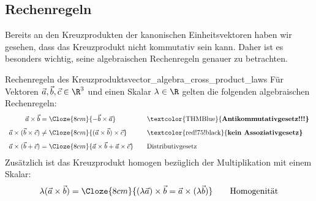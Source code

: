 \subsection{Rechenregeln}
\label{subsec:vector_algebra_cross_product_rules}

Bereits an den Kreuzprodukten der kanonischen Einheitsvektoren haben wir
gesehen, dass das Kreuzprodukt nicht kommutativ sein kann. Daher ist es
besonders wichtig, seine algebraischen Rechenregeln genauer zu betrachten.

\begin{TheoremBox}{Rechenregeln des Kreuzprodukts}{vector_algebra_cross_product_laws}
  Für Vektoren $\vec a,\vec b,\vec c\in\R^3$ und einen Skalar
  $\lambda\in\R$ gelten die folgenden algebraischen Rechenregeln:
  \[
    \begin{array}{r@{\;}c@{\;}l@{\qquad}l}
      \vec a\times\vec b
        &=&\Cloze{8cm}{-\vec b\times\vec a}
        &\text{\textcolor{THMBlue}{\bfseries Antikommutativgesetz!!!}}\\[0.7em]
      \vec a\times(\vec b\times\vec c)
        &\ne&\Cloze{8cm}{(\vec a\times\vec b)\times\vec c}
        &\text{\textcolor{red!75!black}{\bfseries kein Assoziativgesetz}}\\[0.7em]
      \vec a\times(\vec b+\vec c)
        &=&\Cloze{8cm}{\vec a\times\vec b+\vec a\times\vec c}
        &\text{Distributivgesetz}
    \end{array}
  \]
  Zusätzlich ist das Kreuzprodukt homogen bezüglich der Multiplikation mit
  einem Skalar:
  \[
    \begin{array}{r@{\;}c@{\;}l@{\qquad}l}
      \lambda(\vec a\times\vec b)
        &=&\Cloze{8cm}{(\lambda\vec a)\times\vec b
          =\vec a\times(\lambda\vec b)}
        &\text{Homogenität}
    \end{array}
  \]
\end{TheoremBox}

